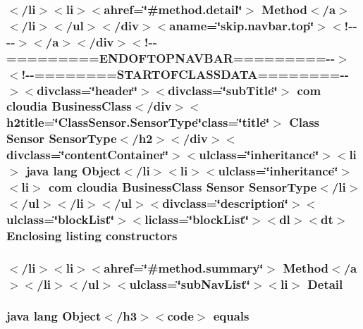 \hypertarget{_sensor_8_sensor_type_8html_a6103a4ee8c56629df9b74d754eea14f6}{
\subsubsection[{constructors}]{\setlength{\rightskip}{0pt plus 5cm}$<$/li$>$$<$li$>$$<$ahref=\char`\"{}\#method.\-detail\char`\"{}$>$ Method$<$/{\bf a}$>$$<$/li$>$$<$/ul$>$$<$/div$>$$<$aname=\char`\"{}skip.\-navbar.\-top\char`\"{}$>$$<$!-\/-\/-\/-\/$>$$<$/a$>$$<$/div$>$$<$!-\/-\/=========E\-N\-D\-O\-F\-T\-O\-P\-N\-A\-V\-B\-A\-R=========-\/-\/$>$$<$!-\/-\/========S\-T\-A\-R\-T\-O\-F\-C\-L\-A\-S\-S\-D\-A\-T\-A========-\/-\/$>$$<$divclass=\char`\"{}header\char`\"{}$>$$<$divclass=\char`\"{}sub\-Title\char`\"{}$>$ com cloudia Business\-Class$<$/div$>$$<$h2title=\char`\"{}Class\-Sensor.\-Sensor\-Type\char`\"{}class=\char`\"{}title\char`\"{}$>$ Class {\bf Sensor} {\bf Sensor\-Type}$<$/h2$>$$<$/div$>$$<$divclass=\char`\"{}content\-Container\char`\"{}$>$$<$ulclass=\char`\"{}inheritance\char`\"{}$>$$<$li$>$ java lang Object$<$/li$>$$<$li$>$$<$ulclass=\char`\"{}inheritance\char`\"{}$>$$<$li$>$ com cloudia Business\-Class {\bf Sensor} {\bf Sensor\-Type}$<$/li$>$$<$/ul$>$$<$/li$>$$<$/ul$>$$<$divclass=\char`\"{}description\char`\"{}$>$$<$ulclass=\char`\"{}block\-List\char`\"{}$>$$<$liclass=\char`\"{}block\-List\char`\"{}$>$$<$dl$>$$<${\bf dt}$>$ Enclosing listing constructors}}\label{_sensor_8_sensor_type_8html_a6103a4ee8c56629df9b74d754eea14f6}
\hypertarget{_sensor_8_sensor_type_8html_a1e04b5ec07bcd5281e26dcd40e5b3a94}{
\subsubsection[{Detail}]{\setlength{\rightskip}{0pt plus 5cm}$<$/li$>$$<$li$>$$<$ahref=\char`\"{}\#method.\-summary\char`\"{}$>$ Method$<$/{\bf a}$>$$<$/li$>$$<$/ul$>$$<$ulclass=\char`\"{}sub\-Nav\-List\char`\"{}$>$$<$li$>$ Detail}}\label{_sensor_8_sensor_type_8html_a1e04b5ec07bcd5281e26dcd40e5b3a94}
\hypertarget{_sensor_8_sensor_type_8html_a8974318cea585f72df717e0380ec7104}{
\subsubsection[{equals}]{\setlength{\rightskip}{0pt plus 5cm}java lang Object$<$/h3$>$$<$code$>$ equals}}\label{_sensor_8_sensor_type_8html_a8974318cea585f72df717e0380ec7104}
